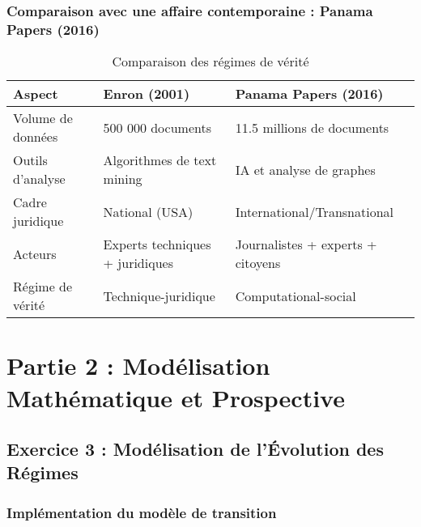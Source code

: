 \documentclass[12pt,a4paper]{article}
\begin{document}
\subsubsection{Comparaison avec une affaire contemporaine : Panama Papers (2016)}

\begin{table}[H]
\centering
\begin{tabular}{|p{}|p{}|p{}|}
\hline
\textbf{Aspect} & \textbf{Enron (2001)} & \textbf{Panama Papers (2016)} \\
\hline
Volume de données & 500 000 documents & 11.5 millions de documents \\
\hline
Outils d'analyse & Algorithmes de text mining & IA et analyse de graphes \\
\hline
Cadre juridique & National (USA) & International/Transnational \\
\hline
Acteurs & Experts techniques + juridiques & Journalistes + experts + citoyens \\
\hline
Régime de vérité & Technique-juridique & Computational-social \\
\hline
\end{tabular}
\caption{Comparaison des régimes de vérité}
\end{table}

\section{Partie 2 : Modélisation Mathématique et Prospective}

\subsection{Exercice 3 : Modélisation de l'Évolution des Régimes}

\subsubsection{Implémentation du modèle de transition}
\end{document}
